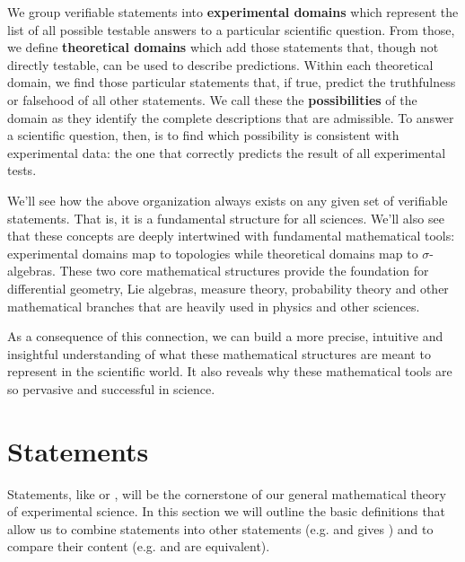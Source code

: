 \documentclass[11pt,letterpaper,fleqn]{memoir} %
\begin{document}
We group verifiable statements into \textbf{experimental domains} which represent the list of all possible testable answers to a particular scientific question. From those, we define \textbf{theoretical domains} which add those statements that, though not directly testable, can be used to describe predictions. Within each theoretical domain, we find those particular statements that, if true, predict the truthfulness or falsehood of all other statements. We call these the \textbf{possibilities} of the domain as they identify the complete descriptions that are admissible. To answer a scientific question, then, is to find which possibility is consistent with experimental data: the one that correctly predicts the result of all experimental tests.

We'll see how the above organization always exists on any given set of verifiable statements. That is, it is a fundamental structure for all sciences. We'll also see that these concepts are deeply intertwined with fundamental mathematical tools: experimental domains map to topologies while theoretical domains map to $\sigma$-algebras. These two core mathematical structures provide the foundation for differential geometry, Lie algebras, measure theory, probability theory and other mathematical branches that are heavily used in physics and other sciences.

As a consequence of this connection, we can build a more precise, intuitive and insightful understanding of what these mathematical structures are meant to represent in the scientific world. It also reveals why these mathematical tools are so pervasive and successful in science.

\section{Statements}

Statements, like  or , will be the cornerstone of our general mathematical theory of experimental science. In this section we will outline the basic definitions that allow us to combine statements into other statements (e.g.  and  gives ) and to compare their content (e.g.  and  are equivalent).
\end{document}
